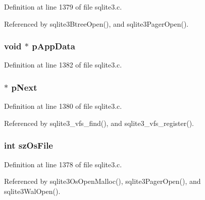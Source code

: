 Definition at line 1379 of file sqlite3.\+c.



Referenced by sqlite3\+Btree\+Open(), and sqlite3\+Pager\+Open().

\hypertarget{structsqlite3__vfs_a2edf2e7445f2f46196126195c7710f75}{}
\subsubsection[{p\+App\+Data}]{\setlength{\rightskip}{0pt plus 5cm}void $\ast$ p\+App\+Data}\label{structsqlite3__vfs_a2edf2e7445f2f46196126195c7710f75}


Definition at line 1382 of file sqlite3.\+c.

\hypertarget{structsqlite3__vfs_abc186adb2e4e9a305637954666a1c970}{}
\subsubsection[{p\+Next}]{ $\ast$ p\+Next}\label{structsqlite3__vfs_abc186adb2e4e9a305637954666a1c970}


Definition at line 1380 of file sqlite3.\+c.



Referenced by sqlite3\+\_\+vfs\+\_\+find(), and sqlite3\+\_\+vfs\+\_\+register().

\hypertarget{structsqlite3__vfs_a96670e11731f3227851f651b807a63c8}{}
\subsubsection[{sz\+Os\+File}]{\setlength{\rightskip}{0pt plus 5cm}int sz\+Os\+File}\label{structsqlite3__vfs_a96670e11731f3227851f651b807a63c8}


Definition at line 1378 of file sqlite3.\+c.



Referenced by sqlite3\+Os\+Open\+Malloc(), sqlite3\+Pager\+Open(), and sqlite3\+Wal\+Open().

\hypertarget{structsqlite3__vfs_abc25aba7356d962a9602b37f3b769001}{}

